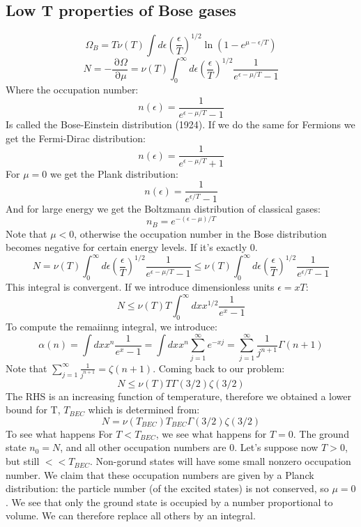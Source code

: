 \documentclass[12 pt]{article}
\DeclareMathOperator {\p} {\partial}
\begin{document}
\subsection*{Low T properties of Bose gases}
\[    \Omega_B = T \nu(T) \int d \epsilon \left( \frac{\epsilon}{T}  \right)^{1/2} \ln(1 - e^{\mu - \epsilon/T})  \]
\[       N = - \frac{\p \Omega}{\p \mu}  = \nu(T) \int_0^{\infty} d \epsilon   \left( \frac{\epsilon}{T}  \right)^{1/2} \frac{1}{e^{\epsilon - \mu / T} - 1}  \]
Where the occupation number:
\[      n(\epsilon) =   \frac{1}{e^{\epsilon - \mu / T} - 1}   \]
Is called the Bose-Einstein distribution (1924). If we do the same for Fermions we get the Fermi-Dirac distribution:
\[       n(\epsilon) =   \frac{1}{e^{\epsilon - \mu / T} + 1}       \]
For $\mu = 0$ we get the Plank distribution:
\[         n(\epsilon) =   \frac{1}{e^{\epsilon / T} - 1}       \]
And for large energy we get the Boltzmann distribution of classical gases:
\[        n_B = e^{- (\epsilon - \mu)/T}      \]
Note that $\mu<0$, otherwise the occupation number in the Bose distribution becomes negative for certain energy levels. If it's exactly 0.
\[     N   = \nu(T) \int_0^{\infty} d \epsilon   \left( \frac{\epsilon}{T}  \right)^{1/2} \frac{1}{e^{\epsilon - \mu / T} - 1} \leq \nu(T) \int_0^{\infty} d \epsilon   \left( \frac{\epsilon}{T}  \right)^{1/2} \frac{1}{e^{\epsilon  / T} - 1}   \]
This integral is convergent. If we introduce dimensionless units $\epsilon = xT$:
\[      N \leq \nu(T) T \int_0^{\infty} dx x^{1/2} \frac{1}{e^x - 1}        \]
To compute the remaiinng integral, we introduce:
\[     \alpha(n) = \int dx x^n \frac{1}{e^x-1} =  \int dx x^n  \sum_{j=1}^{\infty} e^{-xj}  = \sum_{j=1}^{\infty} \frac{1}{j^{n+1}} \Gamma(n+1)  \]
Note that $ \sum_{j=1}^{\infty} \frac{1}{j^{n+1}}  = \zeta (n+1)$. Coming back to our problem:
\[    N \leq \nu(T) T \Gamma(3/2) \zeta(3/2)    \]
The RHS is an increasing function of temperature, therefore we obtained a lower bound for T, $T_{BEC}$ which is determined from:
\[      N = \nu(T_{BEC}) T_{BEC} \Gamma(3/2) \zeta(3/2)       \]
To see what happens For $T<T_{BEC}$, we see what happens for $T=0$. The ground state $n_0 = N$, and all other occupation numbers are 0. Let's suppose now $T>0$, but still $<<T_{BEC}$. Non-gorund states will have some small nonzero occupation number. We claim that these occupation numbers are given by a Planck distribution: the particle number (of the excited states) is not conserved, so $\mu = 0$. We see that only the ground state is occupied by a number proportional to volume. We can therefore replace all others by an integral.
\end{document}
